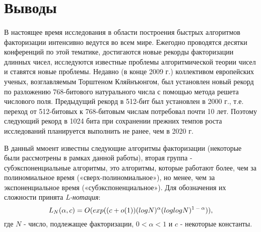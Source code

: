   
\section{Выводы}

\paragraph{} В настоящее время исследования в области построения быстрых алгоритмов факторизации интенсивно ведутся во всем мире. Ежегодно 
  проводятся десятки конференций по этой тематике, достигаются новые рекорды факторизации длинных чисел, исследуются известные проблемы 
  алгоритмической теории чисел и ставятся новые проблемы. Недавно (в конце 2009 г.) коллективом европейских ученых, возглавляемым Торштеном
  Кляйнъюнгом, был установлен новый рекорд по разложению 768-битового натурального числа с помощью метода решета числового поля. Предыдущий
  рекорд в 512-бит был установлен в 2000 г., т.е. переход от 512-битовых к 768-битовым числам потребовал почти 10 лет. Поэтому следующий 
  рекорд в 1024 бита при сохранении прежних темпов роста исследований планируется выполнить не ранее, чем в 2020 г.
  
  В данный ммоент известны следующие алгоритмы факторизации (некоторые были рассмотрены в рамках данной работы),
  вторая группа - субэкспоненциальные алгоритмы, это алгоритмы, которые работают более, чем за полиномиальное время («сверх-полиномиальное»),
  но менее, чем за экспоненциальное время («субэкспоненциальное»). Для обозначения их сложности принята \textit{L-нотация}:  
    \begin{equation}
     \textit{{$ L_N(\alpha,c)=O(exp((c+o(1))(logN)^\alpha(loglogN)\textsuperscript{{$1-\alpha$}})) $}},
    \end{equation}    
  где {$N$} - число, подлежащее факторизации, {$0 < \alpha < 1$}  и {$c$} - некоторые константы.
  
